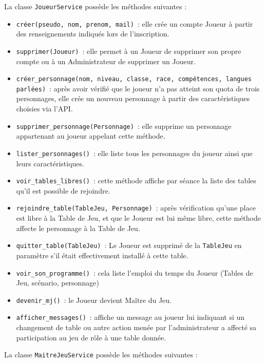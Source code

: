 \documentclass[11pt]{article}
\begin{document}
La classe \texttt{JoueurService} possède les méthodes suivantes :
\begin{itemize}[label=, font=\small]
    \item \texttt{créer(pseudo, nom, prenom, mail)}~: elle crée un compte Joueur à partir des renseignements indiqués lors de l'inscription.
    \item \texttt{supprimer(Joueur)}~: elle permet à un Joueur de supprimer son propre compte ou à un Administrateur de supprimer un Joueur.
    \item \texttt{créer\_personnage(nom, niveau, classe, race, compétences, langues parlées)}~: après avoir vérifié que le joueur n'a pas atteint son quota de trois personnages, elle crée un nouveau personnage à partir des caractéristiques choisies via l'API.
    \item \texttt{supprimer\_personnage(Personnage)}~: elle supprime un personnage appartenant au joueur appelant cette méthode.
    \item \texttt{lister\_personnages()}~: elle liste tous les personnages du joueur ainsi que leurs caractéristiques.
    \item \texttt{voir\_tables\_libres()}~: cette méthode affiche par séance la liste des tables qu'il est possible de rejoindre.
    \item \texttt{rejoindre\_table(TableJeu, Personnage)}~: après vérification qu'une place est libre à la Table de Jeu, et que le Joueur est lui même libre, cette méthode affecte le personnage à la Table de Jeu.
    \item \texttt{quitter\_table(TableJeu)}~: Le Joueur est supprimé de la \texttt{TableJeu} en paramètre s'il était effectivement installé à cette table.
    \item \texttt{voir\_son\_programme()}~: cela liste l'emploi du temps du Joueur (Tables de Jeu, scénario, personnage)
    \item \texttt{devenir\_mj()}~: le Joueur devient Maître du Jeu.
    \item \texttt{afficher\_messages()}~: affiche un message au joueur lui indiquant si un changement de table ou autre action menée par l'administrateur a affecté sa participation au jeu de rôle à une table donnée.
\end{itemize}


\bigbreak


La classe \texttt{MaitreJeuService} possède les méthodes suivantes :
\end{document}
